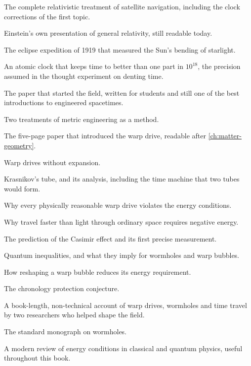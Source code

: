 \begin{furtherreading}
\item[\textcite{Ashby2003}] The complete relativistic treatment of satellite
  navigation, including the clock corrections of the first topic.
\item[\textcite{Einstein1916}] Einstein's own presentation of general
  relativity, still readable today.
\item[\textcite{Dyson1920}] The eclipse expedition of 1919 that measured the
  Sun's bending of starlight.
\item[\textcite{Brewer2019}] An atomic clock that keeps time to better than one
  part in $10^{18}$, the precision assumed in the thought experiment on
  denting time.
\item[\textcite{Morris1988a}] The paper that started the field, written for
  students and still one of the best introductions to engineered spacetimes.
\item[\textcite{McMonigal2012,Schuster2023}] Two treatments of metric
  engineering as a method.
\item[\textcite{Alcubierre1994}] The five-page paper that introduced the warp
  drive, readable after \cref{ch:matter-geometry}.
\item[\textcite{Natario2002}] Warp drives without expansion.
\item[\textcite{Krasnikov1998,Everett1997}] Krasnikov's tube, and its
  analysis, including the time machine that two tubes would form.
\item[\textcite{Santiago2022}] Why every physically reasonable warp drive
  violates the energy conditions.
\item[\textcite{Olum1998}] Why travel faster than light through ordinary
  space requires negative energy.
\item[\textcite{Casimir1948,Lamoreaux1997}] The prediction of the Casimir
  effect and its first precise measurement.
\item[\textcite{Ford1995,Ford1997,Pfenning1997}] Quantum inequalities, and what
  they imply for wormholes and warp bubbles.
\item[\textcite{VanDenBroeck1999}] How reshaping a warp bubble reduces its
  energy requirement.
\item[\textcite{Hawking1992}] The chronology protection conjecture.
\item[\textcite{Everett2011}] A book-length, non-technical account of warp
  drives, wormholes and time travel by two researchers who helped shape the
  field.
\item[\textcite{Visser1995b}] The standard monograph on wormholes.
\item[\textcite{Kontou2020}] A modern review of energy conditions in classical
  and quantum physics, useful throughout this book.
\end{furtherreading}
